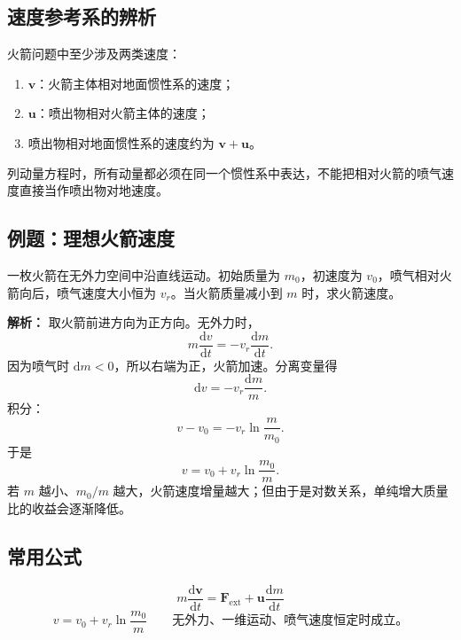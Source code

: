 \subsection{速度参考系的辨析}

火箭问题中至少涉及两类速度：

\begin{enumerate}
    \item $\boldsymbol v$：火箭主体相对地面惯性系的速度；
    \item $\boldsymbol u$：喷出物相对火箭主体的速度；
    \item 喷出物相对地面惯性系的速度约为 $\boldsymbol v+\boldsymbol u$。
\end{enumerate}

列动量方程时，所有动量都必须在同一个惯性系中表达，不能把相对火箭的喷气速度直接当作喷出物对地速度。

\subsection{例题：理想火箭速度}

一枚火箭在无外力空间中沿直线运动。初始质量为 $m_0$，初速度为 $v_0$，喷气相对火箭向后，喷气速度大小恒为 $v_r$。当火箭质量减小到 $m$ 时，求火箭速度。

\textbf{解析：} 取火箭前进方向为正方向。无外力时，
\[
    m\frac{\mathrm dv}{\mathrm dt}
    =
    -v_r\frac{\mathrm dm}{\mathrm dt}.
\]
因为喷气时 $\mathrm dm<0$，所以右端为正，火箭加速。分离变量得
\[
    \mathrm dv=-v_r\frac{\mathrm dm}{m}.
\]
积分：
\[
    v-v_0=-v_r\ln\frac{m}{m_0}.
\]
于是
\[
    \boxed{
    v=v_0+v_r\ln\frac{m_0}{m}
    } .
\]
若 $m$ 越小、$m_0/m$ 越大，火箭速度增量越大；但由于是对数关系，单纯增大质量比的收益会逐渐降低。

\subsection{常用公式}

\[
    \boxed{
    m\frac{\mathrm d\boldsymbol v}{\mathrm dt}
    =
    \boldsymbol F_{\mathrm{ext}}
    +
    \boldsymbol u\frac{\mathrm dm}{\mathrm dt}
    }
\]
\[
    \boxed{
    v=v_0+v_r\ln\frac{m_0}{m}
    }
    \qquad
    \text{无外力、一维运动、喷气速度恒定时成立。}
\]

